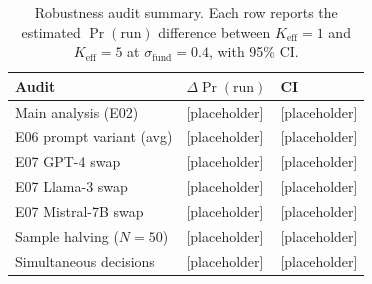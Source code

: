 \begin{table}[h]
\centering
\caption{Robustness audit summary. Each row reports the estimated $\Pr(\text{run})$ difference between $K_{\text{eff}}=1$ and $K_{\text{eff}}=5$ at $\sigma_{\text{fund}}=0.4$, with 95\% CI.}
\label{tab:robust}
\begin{tabular}{lll}
\toprule
Audit & $\Delta\Pr(\text{run})$ & CI \\
\midrule
Main analysis (E02) & [placeholder] & [placeholder] \\
E06 prompt variant (avg) & [placeholder] & [placeholder] \\
E07 GPT-4 swap & [placeholder] & [placeholder] \\
E07 Llama-3 swap & [placeholder] & [placeholder] \\
E07 Mistral-7B swap & [placeholder] & [placeholder] \\
Sample halving ($N=50$) & [placeholder] & [placeholder] \\
Simultaneous decisions & [placeholder] & [placeholder] \\
\bottomrule
\end{tabular}
\end{table}


